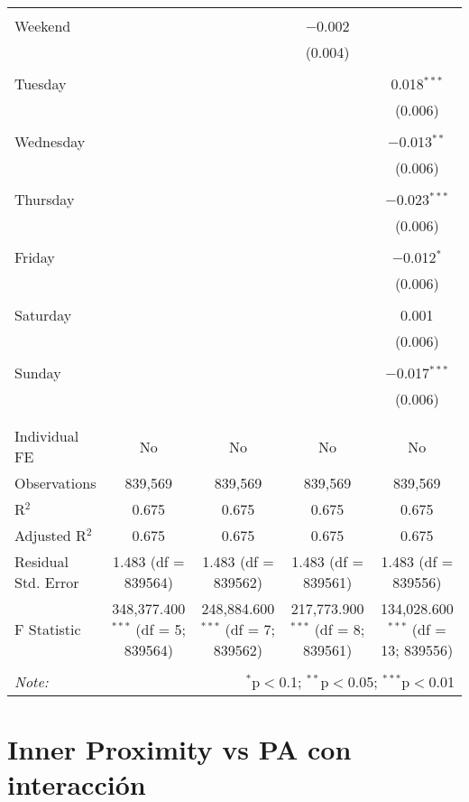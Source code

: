 \documentclass[
]{article}
\begin{document}
\begin{table}[!htbp]
{\begin{tabular}{@{\extracolsep{5pt}}lcccc}
  & & & & \\ 
 Weekend &  &  & $-$0.002 &  \\ 
  &  &  & (0.004) &  \\ 
  & & & & \\ 
 Tuesday &  &  &  & 0.018$^{***}$ \\ 
  &  &  &  & (0.006) \\ 
  & & & & \\ 
 Wednesday &  &  &  & $-$0.013$^{**}$ \\ 
  &  &  &  & (0.006) \\ 
  & & & & \\ 
 Thursday &  &  &  & $-$0.023$^{***}$ \\ 
  &  &  &  & (0.006) \\ 
  & & & & \\ 
 Friday &  &  &  & $-$0.012$^{*}$ \\ 
  &  &  &  & (0.006) \\ 
  & & & & \\ 
 Saturday &  &  &  & 0.001 \\ 
  &  &  &  & (0.006) \\ 
  & & & & \\ 
 Sunday &  &  &  & $-$0.017$^{***}$ \\ 
  &  &  &  & (0.006) \\ 
  & & & & \\ 
\hline \\[-1.8ex] 
Individual FE & No & No & No & No \\ 
Observations & 839,569 & 839,569 & 839,569 & 839,569 \\ 
R$^{2}$ & 0.675 & 0.675 & 0.675 & 0.675 \\ 
Adjusted R$^{2}$ & 0.675 & 0.675 & 0.675 & 0.675 \\ 
Residual Std. Error & 1.483 (df = 839564) & 1.483 (df = 839562) & 1.483 (df = 839561) & 1.483 (df = 839556) \\ 
F Statistic & 348,377.400$^{***}$ (df = 5; 839564) & 248,884.600$^{***}$ (df = 7; 839562) & 217,773.900$^{***}$ (df = 8; 839561) & 134,028.600$^{***}$ (df = 13; 839556) \\ 
\hline 
\hline \\[-1.8ex] 
\textit{Note:}  & \multicolumn{4}{r}{$^{*}$p$<$0.1; $^{**}$p$<$0.05; $^{***}$p$<$0.01} \\ 
\end{tabular}
} 
\end{table} 
\newpage
\section{Inner Proximity vs PA con interacción}
\end{document}
